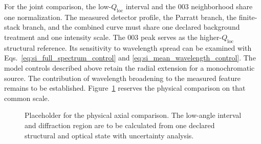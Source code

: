 For the joint comparison, the low-$Q_{\mathrm{loc}}$ interval and the $003$ neighborhood share one normalization. The measured detector profile, the Parratt
branch, the finite-stack branch, and the combined curve must share one declared
background treatment and one intensity scale. The $003$ peak serves as the
higher-$Q_{\mathrm{loc}}$ structural reference. Its sensitivity to wavelength spread can be examined
with Eqs.~\eqref{eq:si_full_spectrum_control} and
\eqref{eq:si_mean_wavelength_control}. The model controls described above
retain the radial extension for a monochromatic source. The contribution of wavelength broadening to the measured feature remains to be established.
Figure~\ref{fig:si_optical_comparison} reserves the physical comparison on that common scale.


\begin{figure}[!htbp]
  \centering
  \caption{Placeholder for the physical axial comparison. The low-angle interval and diffraction region are to be calculated from one declared structural and optical state with uncertainty analysis.}
  \label{fig:si_optical_comparison}
\end{figure}
